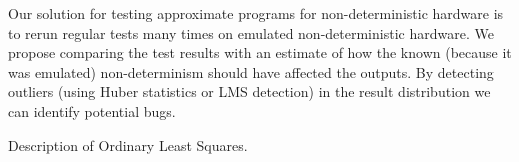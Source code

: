 
Our solution for testing approximate programs for non-deterministic hardware is to rerun regular tests many times on emulated non-deterministic hardware. We propose comparing the test results with an estimate of how the known (because it was emulated) non-determinism should have affected the outputs. By detecting outliers (using Huber statistics or LMS detection) in the result distribution we can identify potential bugs.

Description of Ordinary Least Squares.

